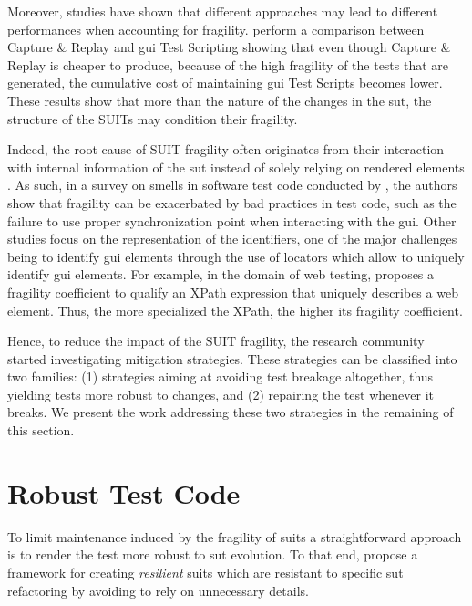 Moreover, studies have shown that different approaches may lead to different performances when accounting for fragility. \textcite{Leotta2013, Leotta2014} perform a comparison between Capture \& Replay and \gls{gui} Test Scripting showing that even though Capture \& Replay is cheaper to produce, because of the high fragility of the tests that are generated, the cumulative cost of maintaining \gls{gui} Test Scripts becomes lower. These results show that more than the nature of the changes in the \gls{sut}, the structure of the SUITs may condition their fragility. 

Indeed, the root cause of SUIT fragility often originates from their interaction with internal information of the \gls{sut} instead of solely relying on rendered elements \cite{Yandrapally2014}. As such, in a survey on smells in software test code conducted by \textcite{Garousi2018}, the authors show that fragility can be exacerbated by bad practices in test code, such as the failure to use proper synchronization point when interacting with the \gls{gui}. Other studies focus on the representation of the identifiers, one of the major challenges being to identify \gls{gui} elements through the use of locators \cite{Hammoudi2016} which allow to uniquely identify \gls{gui} elements. For example, in the domain of web testing, \textcite{Leotta2015} proposes a fragility coefficient to qualify an XPath expression that uniquely describes a web element. Thus, the more specialized the XPath, the higher its fragility coefficient.

Hence, to reduce the impact of the SUIT fragility, the research community started investigating mitigation strategies. These strategies can be classified into two families: (1) strategies aiming at avoiding test breakage altogether, thus yielding tests more robust to changes, and (2) repairing the test whenever it breaks. We present the work addressing these two strategies in the remaining of this section.

\section{Robust Test Code}
\label{sec:related-robust}

To limit maintenance induced by the fragility of \gls{suit}s a straightforward approach is to render the test more robust to \gls{sut} evolution. To that end, \textcite{Pirzadeh2014} propose a framework for creating \emph{resilient} \gls{suit}s which are resistant to specific \gls{sut} refactoring by avoiding to rely on unnecessary details. 

